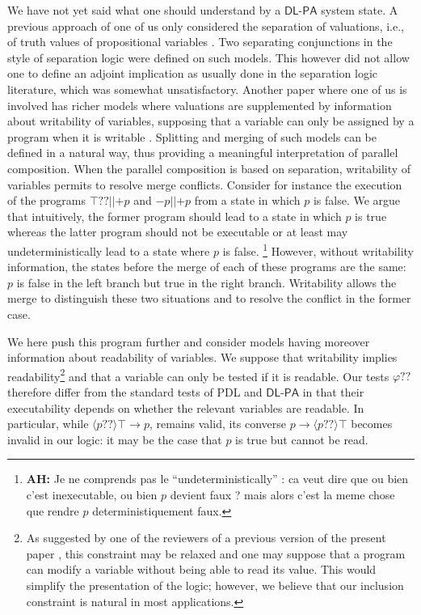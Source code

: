 \documentclass{llncs}
\newcommand{\pll}{ {||} }							%
\newcommand{\testendo}{?\!\!?}			%
\newcommand{\Dlpa}{\ensuremath{\mathsf{DL\text{-}PA}}\xspace}
\newcommand{\ah}[1]{\footnote{\textbf{AH:} #1}}
\newcommand{\assgntopV}[1]{{\mathtt {+} #1}}
\newcommand{\assgnbotV}[1]{{\mathtt {-} #1}}
\newcommand{\ldia}[1]{ \big\langle #1 \big\rangle}
\newcommand{\limp}{ \rightarrow }
\renewcommand{\phi}{\varphi}
\begin{document}
We have not yet said what one should understand by a \Dlpa system state. 
A previous approach of one of us only considered the separation of valuations, i.e., 
of truth values of propositional variables \cite{Herzig-Wollic13}. 
Two separating conjunctions in the style of separation logic were defined on such models. 
This however did not allow one to define an adjoint implication as usually done in the separation logic literature, which was somewhat unsatisfactory. 
%
Another paper where one of us is involved has richer models where valuations are supplemented by information about writability of variables, supposing that a variable can only be assigned by a program when it is writable \cite{HerzigEtal-Ijcai19}. 
Splitting and merging of such models can be defined in a natural way, thus providing a meaningful interpretation of parallel composition. 
When the parallel composition is based on separation, writability of variables permits to resolve merge conflicts.
Consider for instance the execution of the programs $\top \testendo \pll \assgntopV p$ and $\assgnbotV p \pll \assgntopV p$ from a state in which $p$ is false.
We argue that intuitively, the former program should lead to a state in which $p$ is true
whereas the latter program should not be executable or at least may undeterministically lead to a state where $p$ is false.
\ah{
Je ne comprends pas le ``undeterministically'' : ca veut dire que ou bien c'est inexecutable, ou bien $p$ devient faux ? mais alors c'est la meme chose que rendre $p$ deterministiquement faux. 
}
However, without writability information, the states before the merge of each of these programs are the same:
$p$ is false in the left branch but true in the right branch.
Writability allows the merge to distinguish these two situations and to resolve the conflict in the former case.

We here push this program further and consider models having moreover information about readability of variables. 
We suppose that writability implies readability\footnote{%
As suggested by one of the reviewers of a previous version of the present paper \cite{DBLP:conf/tap/BoudouHT19}, this constraint may be relaxed 
and one may suppose that a program can modify a variable without being able to read its value. 
This would simplify the presentation of the logic; however, we believe that our inclusion constraint is natural in most applications.
}
and that a variable can only be tested if it is readable. 
Our tests $\phi \testendo$ therefore differ from the standard tests of PDL and \Dlpa in that their 
executability depends on whether the relevant variables are readable. In particular, while 
$\ldia{ p \testendo } \top \limp p$, remains valid, its converse
$p \limp \ldia{ p \testendo } \top $ becomes invalid in our logic: 
it may be the case that $p$ is true but cannot be read.
\end{document}
